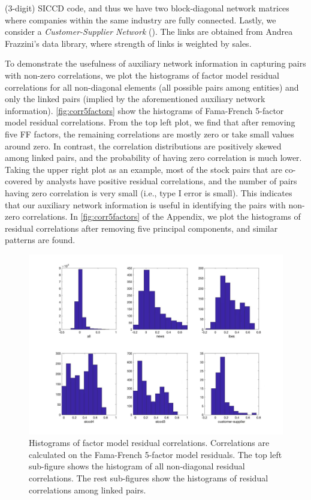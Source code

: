 (3-digit) SICCD code, and thus we have two block-diagonal network matrices where companies within the same industry are fully connected. Lastly, we consider a \textit{Customer-Supplier Network} (\cite{cohen2008economic}). The links are obtained from Andrea Frazzini's data library, where strength of links is weighted by sales.

To demonstrate the usefulness of auxiliary network information in capturing pairs with non-zero correlations, we plot the histograms of factor model residual correlations for all non-diagonal elements (all possible pairs among entities) and only the linked pairs (implied by the aforementioned auxiliary network information). \autoref{fig:corr5factors} show the histograms of Fama-French 5-factor model residual correlations. From the top left plot, we find that after removing five FF factors, the remaining correlations are mostly zero or take small values around zero. In contrast, the correlation distributions are positively skewed among linked pairs, 
and the probability of having zero correlation is much lower. Taking the upper right plot as an example, most of the stock pairs that are co-covered by analysts have positive residual correlations, and the number of pairs having zero correlation is very small (i.e., type I error is small). This indicates that our auxiliary network information is useful in identifying the pairs with non-zero correlations. In \autoref{fig:corr5factors} of the Appendix, we plot the histograms of residual correlations after removing five principal components, and similar patterns are found.
\begin{figure}[H]
    \centering
    \includegraphics[scale=0.25]{pic/corr_5factors.jpg}
    \caption{Histograms of factor model residual correlations. Correlations are calculated on the Fama-French 5-factor model residuals. The top left sub-figure shows the histogram of all non-diagonal residual correlations. The rest sub-figures show the histograms of residual correlations among linked pairs.}
    \label{fig:corr5factors}
\end{figure}

